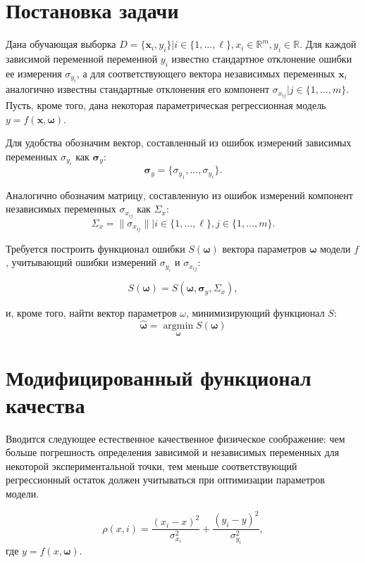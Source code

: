 \documentclass[11pt,a4paper]{article}
\newcommand{\bomega}{\boldsymbol{\omega}}
\begin{document}
\section{Постановка задачи}

Дана обучающая выборка $D = \{ \mathbf{x}_i, y_i \} | i \in \{ 1, \dots, \ell \}, x_i \in \mathbb{R}^m, y_i \in \mathbb{R}$.
Для каждой зависимой переменной переменной $y_i$ известно
стандартное отклонение ошибки ее измерения $\sigma_{y_i}$, а для соответствующего
вектора независимых переменных $\mathbf{x}_i$ аналогично известны стандартные
отклонения его компонент $\sigma_{x_{ij}} | j \in \{ 1, \dots, m \}$.
Пусть, кроме того, дана некоторая параметрическая регрессионная модель
$y = f (\mathbf{x}, \bomega)$.

Для удобства обозначим вектор, составленный из ошибок измерений зависимых переменных
$\sigma_{y_i}$ как $\boldsymbol{\sigma}_y$:
\[
  \boldsymbol{\sigma}_y = \{ \sigma_{y_1}, \dots, \sigma_{y_{\ell}} \}.
\]

Аналогично обозначим матрицу, составленную из ошибок измерений компонент
независимых переменных $\sigma_{x_{ij}}$ как $\Sigma_x$:
\[
  \Sigma_x = \| \sigma_{x_{ij}} \| | i \in \{ 1, \dots, \ell \}, j \in \{ 1, \dots, m \}.
\]

Требуется построить функционал ошибки $S(\bomega)$ вектора параметров
$\bomega$ модели $f$, учитывающий ошибки измерений $\sigma_{y_i}$ и
$\sigma_{x_{ij}}$:

\begin{equation}
  S(\bomega) = S(\bomega, \boldsymbol{\sigma}_y, \Sigma_x),
\end{equation}

и, кроме того, найти вектор параметров $\omega$, минимизирующий функционал
$S$:
\begin{equation}
  \hat{\bomega} = \mathop{\arg \min}\limits_{\bomega} S(\bomega)
\end{equation}

\section{Модифицированный функционал качества}

Вводится следующее естественное качественное физическое соображение:
чем больше погрешность определения зависимой и независимых переменных
для некоторой экспериментальной точки, тем меньше соответствующий
регрессионный остаток должен учитываться при оптимизации параметров модели.

\begin{equation}
  \rho(x, i) = \frac{(x_i - x)^2}{\sigma_{x_i}^2} + \frac{(y_i - y)^2}{\sigma_{y_i}^2},
  \label{eq:dist0}
\end{equation}
где $y = f(x, \bomega)$.
\end{document}
